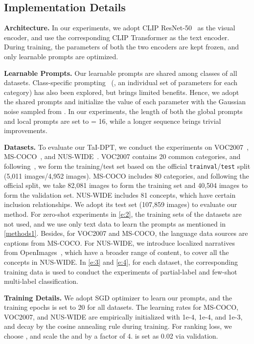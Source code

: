 \documentclass[10pt,twocolumn,letterpaper]{article}
\begin{document}
\subsection{Implementation Details}
\label{e:1}
\noindent \textbf{Architecture.} 
In our experiments, we adopt CLIP ResNet-50~\cite{clip} as the visual encoder, and use the corresponding CLIP Transformer as the text encoder.
During training, the parameters of both the two encoders are kept frozen, and only learnable prompts are optimized.

\noindent \textbf{Learnable Prompts.} 
Our learnable prompts are shared among classes of all datasets. 
Class-specific prompting~\cite{coop} (\ie, an individual set of parameters for each category) has also been explored, but brings limited benefits.
Hence, we adopt the shared prompts and initialize the value of each parameter with the Gaussian noise sampled from .
In our experiments, the length of both the global prompts and local prompts are set to  = 16, while a longer sequence brings trivial improvements. 


\noindent \textbf{Datasets.} 
To evaluate our TaI-DPT, we conduct the experiments on VOC2007~\cite{voc2007}, MS-COCO~\cite{coco}, and NUS-WIDE~\cite{nuswide}.
VOC2007 contains 20 common categories, and following~\cite{chen2019multi,chen2019learning,dualcoop}, we form the training/test set based on the official \texttt{trainval}/\texttt{test} split (5,011 images/4,952 images).
MS-COCO includes 80 categories, and following the official split, we take 82,081 images to form the training set and 40,504 images to form the validation set. 
NUS-WIDE includes 81 concepts, which have certain inclusion relationships. We adopt its test set (107,859 images) to evaluate our method.
For zero-shot experiments in \cref{e:2}, the training sets of the datasets are not used, and we use only text data to learn the prompts as mentioned in \cref{methods1}.
Besides, for VOC2007 and MS-COCO, the language data sources are captions from MS-COCO.
For NUS-WIDE, we introduce localized narratives from OpenImages~\cite{openimages}, which have a broader range of content, to cover all the concepts in NUS-WIDE.
In \cref{e:3} and \cref{e:4}, for each dataset, the corresponding training data is used to conduct the experiments of partial-label and few-shot multi-label classification.


\noindent \textbf{Training Details.}
We adopt SGD optimizer to learn our prompts, and the training epochs is set to 20 for all datasets.
The learning rates for MS-COCO, VOC2007, and NUS-WIDE are empirically initialized with 1e-4, 1e-4, and 1e-3, and decay by the cosine annealing rule during training.
For ranking loss, we choose , and scale the  and  by a factor of 4.
 is set as 0.02 via validation.
\end{document}
